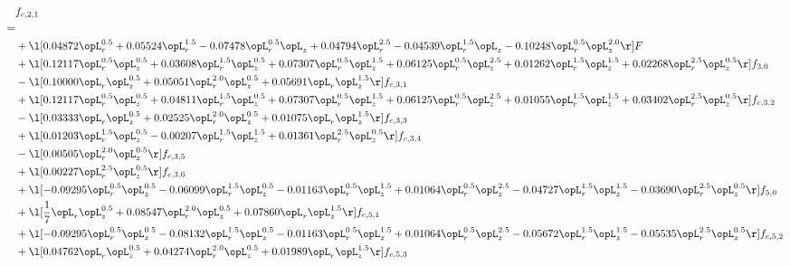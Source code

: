 \begin{alignat}{2} 
\label{eq:f_21_2} 
& f_{c,2,1} \nonumber \\ 
 = \\ 
& + \l[  0.04872 \opL_r^{0.5} +  0.05524 \opL_r^{1.5}   -0.07478 \opL_r^{0.5} \opL_z +  0.04794 \opL_r^{2.5}   -0.04539 \opL_r^{1.5} \opL_z   -0.10248 \opL_r^{0.5} \opL_z^{2.0}  \r] F \nonumber \\ 
& + \l[  0.12117 \opL_r^{0.5} \opL_z^{0.5} +  0.03608 \opL_r^{1.5} \opL_z^{0.5} +  0.07307 \opL_r^{0.5} \opL_z^{1.5} +  0.06125 \opL_r^{0.5} \opL_z^{2.5} +  0.01262 \opL_r^{1.5} \opL_z^{1.5} +  0.02268 \opL_r^{2.5} \opL_z^{0.5}  \r] f_{3,0} \nonumber \\ 
& - \l[  0.10000 \opL_r \opL_z^{0.5} +  0.05051 \opL_r^{2.0} \opL_z^{0.5} +  0.05691 \opL_r \opL_z^{1.5}  \r] f_{c,3,1} \nonumber \\ 
& + \l[  0.12117 \opL_r^{0.5} \opL_z^{0.5} +  0.04811 \opL_r^{1.5} \opL_z^{0.5} +  0.07307 \opL_r^{0.5} \opL_z^{1.5} +  0.06125 \opL_r^{0.5} \opL_z^{2.5} +  0.01055 \opL_r^{1.5} \opL_z^{1.5} +  0.03402 \opL_r^{2.5} \opL_z^{0.5}  \r] f_{c,3,2} \nonumber \\ 
& - \l[  0.03333 \opL_r \opL_z^{0.5} +  0.02525 \opL_r^{2.0} \opL_z^{0.5} +  0.01075 \opL_r \opL_z^{1.5}  \r] f_{c,3,3} \nonumber \\ 
& + \l[  0.01203 \opL_r^{1.5} \opL_z^{0.5}   -0.00207 \opL_r^{1.5} \opL_z^{1.5} +  0.01361 \opL_r^{2.5} \opL_z^{0.5}  \r] f_{c,3,4} \nonumber \\ 
& - \l[  0.00505 \opL_r^{2.0} \opL_z^{0.5}  \r] f_{c,3,5} \nonumber \\ 
& + \l[  0.00227 \opL_r^{2.5} \opL_z^{0.5}  \r] f_{c,3,6} \nonumber \\ 
& + \l[  -0.09295 \opL_r^{0.5} \opL_z^{0.5}   -0.06099 \opL_r^{1.5} \opL_z^{0.5}   -0.01163 \opL_r^{0.5} \opL_z^{1.5} +  0.01064 \opL_r^{0.5} \opL_z^{2.5}   -0.04727 \opL_r^{1.5} \opL_z^{1.5}   -0.03690 \opL_r^{2.5} \opL_z^{0.5}  \r] f_{5,0} \nonumber \\ 
& + \l[ \frac{1}{7} \opL_r \opL_z^{0.5} +  0.08547 \opL_r^{2.0} \opL_z^{0.5} +  0.07860 \opL_r \opL_z^{1.5}  \r] f_{c,5,1} \nonumber \\ 
& + \l[  -0.09295 \opL_r^{0.5} \opL_z^{0.5}   -0.08132 \opL_r^{1.5} \opL_z^{0.5}   -0.01163 \opL_r^{0.5} \opL_z^{1.5} +  0.01064 \opL_r^{0.5} \opL_z^{2.5}   -0.05672 \opL_r^{1.5} \opL_z^{1.5}   -0.05535 \opL_r^{2.5} \opL_z^{0.5}  \r] f_{c,5,2} \nonumber \\ 
& + \l[  0.04762 \opL_r \opL_z^{0.5} +  0.04274 \opL_r^{2.0} \opL_z^{0.5} +  0.01989 \opL_r \opL_z^{1.5}  \r] f_{c,5,3} \nonumber \\ 

\end{alignat}
